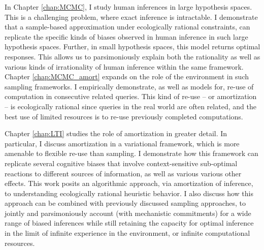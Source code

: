
In Chapter \ref{chap:MCMC}, I study human inferences in large hypothesis spaces. This is a challenging problem, where exact inference is intractable. I demonstrate that a sample-based approximation under ecologically rational constraints, can replicate the specific kinds of biases observed in human inference in such large hypothesis spaces. 
Further, in small hypothesis spaces, this model returns optimal responses. This allows us to parsimoniously explain both the rationality as well as various kinds of irrationality of human inference within the same framework. Chapter \ref{chap:MCMC_amort} expands on the role of the environment in such sampling frameworks. I empirically demonstrate, as well as models for, re-use of computation in consecutive related queries. This kind of re-use -- or amortization -- is ecologically rational since queries in the real world are often related, and the best use of limited resources is to re-use previously completed computations.

Chapter \ref{chap:LTI} studies the role of amortization in greater detail. In particular, I discuss amortization in a variational framework, which is more amenable to flexible re-use than sampling. I demonstrate how this framework can replicate several cognitive biases that involve context-sensitive sub-optimal reactions to different sources of information, 
as well as various various other effects.
This work posits an algorithmic approach, via amortization of inference, to understanding ecologically rational heuristic behavior. I also discuss how this approach can be combined with previously discussed sampling approaches, to jointly and parsimoniously account (with mechanistic commitments) for a wide range of biased inferences while still retaining the capacity for optimal inference in the limit of infinite experience in the environment, or infinite computational resources.

